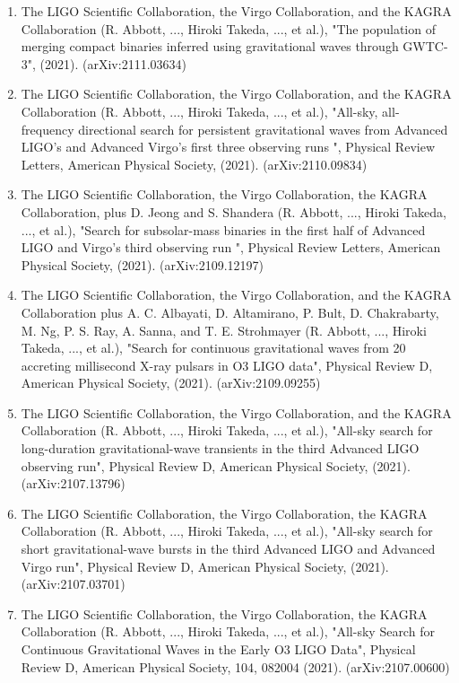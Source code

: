 \documentclass[12pt,a4paper]{article}
\begin{document}
\begin{enumerate}
\item The LIGO Scientific Collaboration, the Virgo Collaboration, and the KAGRA Collaboration (R. Abbott, ..., Hiroki Takeda, ..., et al.), "The population of merging compact binaries inferred using gravitational waves through GWTC-3", (2021). (arXiv:2111.03634)

\item The LIGO Scientific Collaboration, the Virgo Collaboration, and the KAGRA Collaboration (R. Abbott, ..., Hiroki Takeda, ..., et al.), "All-sky, all-frequency directional search for persistent gravitational waves from Advanced LIGO's and Advanced Virgo's first three observing runs ", Physical Review Letters, American Physical Society, (2021). (arXiv:2110.09834)

\item The LIGO Scientific Collaboration, the Virgo Collaboration, the KAGRA Collaboration, plus D. Jeong and S. Shandera (R. Abbott, ..., Hiroki Takeda, ..., et al.), "Search for subsolar-mass binaries in the first half of Advanced LIGO and Virgo's third observing run ", Physical Review Letters, American Physical Society, (2021). (arXiv:2109.12197)

\item The LIGO Scientific Collaboration, the Virgo Collaboration, and the KAGRA Collaboration plus A. C. Albayati, D. Altamirano, P. Bult, D. Chakrabarty, M. Ng, P. S. Ray, A. Sanna, and T. E. Strohmayer (R. Abbott, ..., Hiroki Takeda, ..., et al.), "Search for continuous gravitational waves from 20 accreting millisecond X-ray pulsars in O3 LIGO data", Physical Review D, American Physical Society, (2021). (arXiv:2109.09255)

\item The LIGO Scientific Collaboration, the Virgo Collaboration, and the KAGRA Collaboration (R. Abbott, ..., Hiroki Takeda, ..., et al.), "All-sky search for long-duration gravitational-wave transients in the third Advanced LIGO observing run", Physical Review D, American Physical Society, (2021). (arXiv:2107.13796)

\item The LIGO Scientific Collaboration, the Virgo Collaboration, the KAGRA Collaboration (R. Abbott, ..., Hiroki Takeda, ..., et al.), "All-sky search for short gravitational-wave bursts in the third Advanced LIGO and Advanced Virgo run", Physical Review D, American Physical Society, (2021). (arXiv:2107.03701)

\item The LIGO Scientific Collaboration, the Virgo Collaboration, the KAGRA Collaboration (R. Abbott, ..., Hiroki Takeda, ..., et al.), "All-sky Search for Continuous Gravitational Waves in the Early O3 LIGO Data", Physical Review D, American Physical Society, 104, 082004 (2021). (arXiv:2107.00600)


\end{enumerate}
\end{document}

